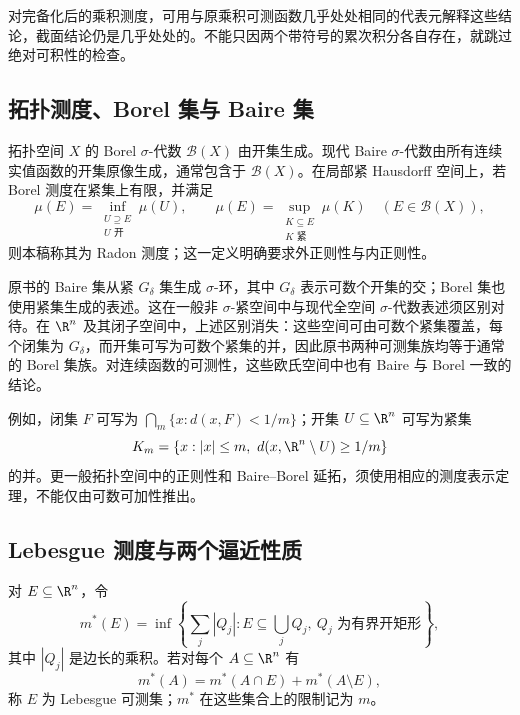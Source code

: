 对完备化后的乘积测度，可用与原乘积可测函数几乎处处相同的代表元解释这些结论，截面结论仍是几乎处处的。不能只因两个带符号的累次积分各自存在，就跳过绝对可积性的检查。

\subsection{拓扑测度、Borel 集与 Baire 集}
\begin{definition}\label{def:y0-topological-measure}
拓扑空间 $X$ 的 Borel $\sigma$-代数 $\mathcal B(X)$ 由开集生成。现代 Baire $\sigma$-代数由所有连续实值函数的开集原像生成，通常包含于 $\mathcal B(X)$。在局部紧 Hausdorff 空间上，若 Borel 测度在紧集上有限，并满足
\[
 \mu(E)=\inf_{\substack{U\supseteq E\\U\text{ 开}}}\mu(U),\qquad
 \mu(E)=\sup_{\substack{K\subseteq E\\K\text{ 紧}}}\mu(K)
 \quad(E\in\mathcal B(X)),
\]
则本稿称其为 Radon 测度；这一定义明确要求外正则性与内正则性。
\end{definition}

原书的 Baire 集从紧 $G_\delta$ 集生成 $\sigma$-环，其中 $G_\delta$ 表示可数个开集的交；Borel 集也使用紧集生成的表述。这在一般非 $\sigma$-紧空间中与现代全空间 $\sigma$-代数表述须区别对待。在 $\R^n$ 及其闭子空间中，上述区别消失：这些空间可由可数个紧集覆盖，每个闭集为 $G_\delta$，而开集可写为可数个紧集的并，因此原书两种可测集族均等于通常的 Borel 集族。对连续函数的可测性，这些欧氏空间中也有 Baire 与 Borel 一致的结论。

例如，闭集 $F$ 可写为 $\bigcap_m\{x:d(x,F)<1/m\}$；开集 $U\subseteq\R^n$ 可写为紧集
\[
 K_m=\{x:|x|\le m,\ d(x,\R^n\setminus U)\ge1/m\}
\]
的并。更一般拓扑空间中的正则性和 Baire--Borel 延拓，须使用相应的测度表示定理，不能仅由可数可加性推出。

\subsection{Lebesgue 测度与两个逼近性质}
\begin{definition}\label{def:y0-lebesgue}
对 $E\subseteq\R^n$，令
\[
 m^*(E)=\inf\left\{\sum_j|Q_j|:
               E\subseteq\bigcup_jQ_j,\ Q_j\text{ 为有界开矩形}\right\},
\]
其中 $|Q_j|$ 是边长的乘积。若对每个 $A\subseteq\R^n$ 有
\[
 m^*(A)=m^*(A\cap E)+m^*(A\setminus E),
\]
称 $E$ 为 Lebesgue 可测集；$m^*$ 在这些集合上的限制记为 $m$。
\end{definition}

